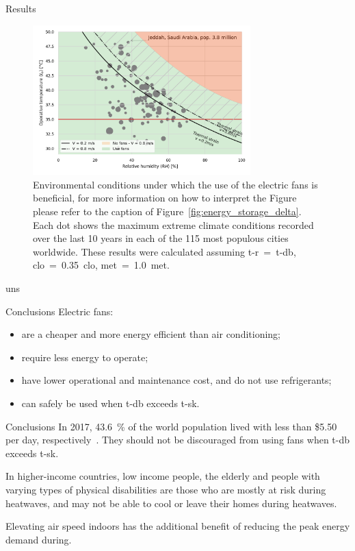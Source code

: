 \documentclass[aspectratio=169]{beamer}
\begin{document}
    \begin{frame}{Results}
        \begin{figure}[thb!]
            \centering
            \includegraphics[width=0.75\textwidth]{figures/use_fans_and_population}
            \caption{Environmental conditions under which the use of the electric fans is beneficial, for more information on how to interpret the Figure please refer to the caption of Figure~\ref{fig:energy_storage_delta}.
            Each dot shows the maximum extreme climate conditions recorded over the last 10 years in each of the 115 most populous cities worldwide.
            These results were calculated assuming \ac{t-r}~=~\ac{t-db}, \ac{clo}~=~0.35~clo, \ac{met}~=~1.0~met.}
            \label{fig:use_fans_and_population}
        \end{figure}
    \end{frame}uns

    \begin{frame}{Conclusions}
        Electric fans:
        \begin{itemize}
            \item are a cheaper and more energy efficient than air conditioning;
            \item require less energy to operate;
            \item have lower operational and maintenance cost, and do not use refrigerants;
            \item can safely be used when \ac{t-db} exceeds \ac{t-sk}.
        \end{itemize}
    \end{frame}

    \begin{frame}{Conclusions}
        In 2017, 43.6~\% of the world population lived with less than \$5.50 per day, respectively~\cite{PovertyO1:online}.
        They should not be discouraged from using fans when \ac{t-db} exceeds \ac{t-sk}.

        In higher-income countries, low income people, the elderly and people with varying types of physical disabilities are those who are mostly at risk during heatwaves, and may not be able to cool or leave their homes during heatwaves.

        Elevating air speed indoors has the additional benefit of reducing the peak energy demand during.
    \end{frame}
\end{document}
